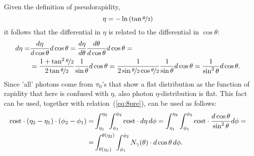 Given the definition of pseudorapidity, 
\begin{equation}
\eta = -\ln \left( \tan \nicefrac{\theta}{2} \right)
\label{eq:7}
\end{equation}
it follows that the differential in $\eta$ is related to the differential in $\cos\theta$:
\begin{equation}
\begin{split}
d\eta  = &
\frac{d\eta}{d\cos\theta} d\cos\theta = \frac{d\eta}{d\theta}\frac{d\theta}{d\cos\theta} d\cos\theta=\\ 
 & =\frac{1+\tan^2\nicefrac[]{\theta}{2}
 }{2\tan\nicefrac{\theta}{2}} \frac{1}{\sin\theta} d\cos\theta =
 \frac{1}{2\sin\nicefrac[]{\theta}{2}\cos\nicefrac[]{\theta}{2}} \frac{1}{\sin\theta}  d\cos\theta  
 = \frac{1}{\sin^2\theta}  d\cos\theta .
\label{eq:8pre}
\end{split}
\end{equation}
Since 'all' photons come from $\pi_0$'s that show a flat
distribution as the function of rapidity that here is confused with $\eta$, also photon $\eta$-distribution is flat.
This fact can be used, together with relation~(\ref{eq:8pre}), can be used as follows:
\begin{equation}
\begin{split}
{\rm cost}\cdot\left( \eta_2 - \eta_1 \right)\cdot\left( \phi_2 - \phi_1 \right) = & \int_{\eta_1}^{\eta_2}\int_{\phi_1}^{\phi_2} {\rm cost}\cdot d\eta\, d\phi = \int_{\eta_1}^{\eta_2}\int_{\phi_1}^{\phi_2} {\rm cost}\cdot \frac{d\cos \theta}{\sin^2 \theta} d\phi = \\
= & \int_{\theta(\eta_1)}^{\theta(\eta_2)}\int_{\phi_1}^{\phi_2} N_\gamma(\theta)\cdot d\cos \theta\, d\phi .
\label{eq:8}
\end{split}
\end{equation}
